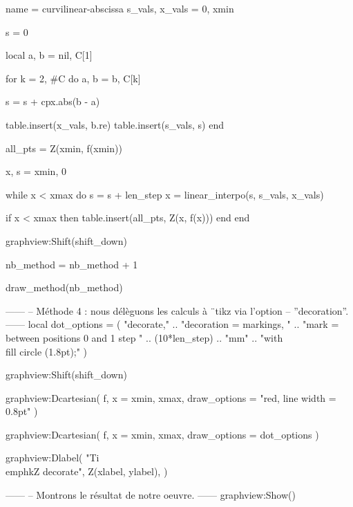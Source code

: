 \documentclass[border = 3pt]{standalone}
\begin{document}
\begin{luadraw*}{name = curvilinear-abscissa}
s_vals, x_vals = {0}, {xmin}

s = 0

local a, b = nil, C[1]

for k = 2, #C do
  a, b = b, C[k]

  s = s + cpx.abs(b - a)

  table.insert(x_vals, b.re)
  table.insert(s_vals, s)
end

all_pts = {Z(xmin, f(xmin))}

x, s = xmin, 0

while x < xmax do
  s = s + len_step
  x = linear_interpo(s, s_vals, x_vals)

  if x < xmax then
    table.insert(all_pts, Z(x, f(x)))
  end
end

graphview:Shift(shift_down)

nb_method = nb_method + 1

draw_method(nb_method)

------
-- Méthode 4 : nous délèguons les calculs à ¨tikz via l'option
-- ''decoration''.
------
local dot_options = (
     "decorate,"
  .. "decoration = {markings, "
  .. "mark = between positions 0 and 1 step "
  .. (10*len_step) .. "mm"
  .. "with {\\fill circle (1.8pt);}}"
)

graphview:Shift(shift_down)

graphview:Dcartesian(
  f,
  {
    x = {xmin, xmax},
    draw_options = "red, line width = 0.8pt"
  }
)

graphview:Dcartesian(
  f,
  {
    x = {xmin, xmax},
    draw_options = dot_options
  }
)

graphview:Dlabel(
  "Ti\\emph{k}Z decorate", Z(xlabel, ylabel),
  {}
)

------
-- Montrons le résultat de notre oeuvre.
------
graphview:Show()
\end{luadraw*}
\end{document}
